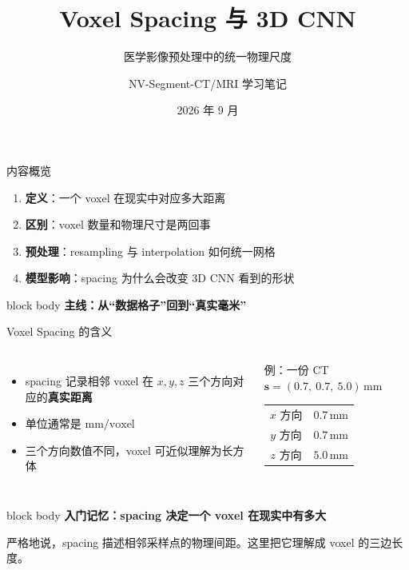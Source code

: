 \documentclass[aspectratio=169,14pt]{beamer}
\title[Voxel Spacing]{Voxel Spacing 与 3D CNN}
\subtitle{医学影像预处理中的统一物理尺度}
\author[学习笔记]{NV-Segment-CT/MRI 学习笔记}
\institute[医学影像分割]{面向入门学习者的简明讲解}
\date[2026.09]{2026 年 9 月}
\newcommand{\key}[1]{\textcolor{BeamerRoyal}{\textbf{#1}}}
\newcommand{\unit}[1]{\,\mathrm{#1}}
\newcommand{\takeaway}[1]{%
  \begin{beamercolorbox}[wd=\linewidth,sep=.22cm,center,rounded=true,shadow=true]{block body}
    \textcolor{BeamerDeep}{\textbf{#1}}
  \end{beamercolorbox}
}
\begin{document}
\begin{frame}
  \titlepage
\end{frame}

\begin{frame}{内容概览}
  \vspace{0.15cm}
  \begin{enumerate}
    \item \key{定义}：一个 voxel 在现实中对应多大距离
    \item \key{区别}：voxel 数量和物理尺寸是两回事
    \item \key{预处理}：resampling 与 interpolation 如何统一网格
    \item \key{模型影响}：spacing 为什么会改变 3D CNN 看到的形状
  \end{enumerate}
  \vfill
  \takeaway{主线：从“数据格子”回到“真实毫米”}
\end{frame}

\begin{frame}{Voxel Spacing 的含义}
  \begin{columns}[T,onlytextwidth]
      \begin{itemize}
        \item spacing 记录相邻 voxel 在 $x,y,z$ 三个方向对应的\key{真实距离}
        \item 单位通常是 $\mathrm{mm/voxel}$
        \item 三个方向数值不同，voxel 可近似理解为长方体
      \end{itemize}
      \begin{block}{例：一份 CT}
        \centering
        \vspace{0.08cm}
        $\mathbf{s}=(0.7,\ 0.7,\ 5.0)\unit{mm}$
        \vspace{0.12cm}

        \renewcommand{\arraystretch}{1.22}
        \begin{tabular}{c@{\quad}c}
          $x$ 方向 & $0.7\unit{mm}$\\
          $y$ 方向 & $0.7\unit{mm}$\\
          $z$ 方向 & $5.0\unit{mm}$
        \end{tabular}
      \end{block}
  \end{columns}
  \vspace{0.24cm}
  \takeaway{入门记忆：spacing 决定一个 voxel 在现实中有多大}
  \vspace{0.08cm}
  {\fontsize{9.5}{12}\selectfont\color{black!58}
  严格地说，spacing 描述相邻采样点的物理间距。这里把它理解成 voxel 的三边长度。}
\end{frame}
\end{document}
